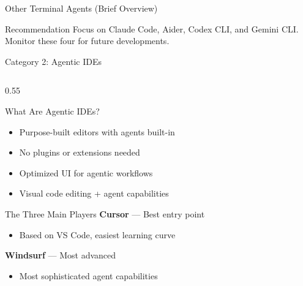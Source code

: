\documentclass[aspectratio=169,11pt]{beamer}
\begin{document}
\begin{frame}{Other Terminal Agents (Brief Overview)}
    \vspace{0.2cm}
    \begin{exampleblock}{Recommendation}
        Focus on Claude Code, Aider, Codex CLI, and Gemini CLI. Monitor these four for future developments.
    \end{exampleblock}

\end{frame}

\begin{frame}{Category 2: Agentic IDEs}
    \begin{columns}[T]
        \begin{column}{0.55\textwidth}
            \begin{block}{What Are Agentic IDEs?}
                \begin{itemize}
                    \item Purpose-built editors with agents built-in
                    \item No plugins or extensions needed
                    \item Optimized UI for agentic workflows
                    \item Visual code editing + agent capabilities
                \end{itemize}
            \end{block}

            \begin{block}{The Three Main Players}
                \textbf{Cursor} --- Best entry point
                \begin{itemize}
                    \item Based on VS Code, easiest learning curve
                \end{itemize}

                \textbf{Windsurf} --- Most advanced
                \begin{itemize}
                    \item Most sophisticated agent capabilities
                \end{itemize}


\end{block}
\end{column}
\end{columns}
\end{frame}
\end{document}

